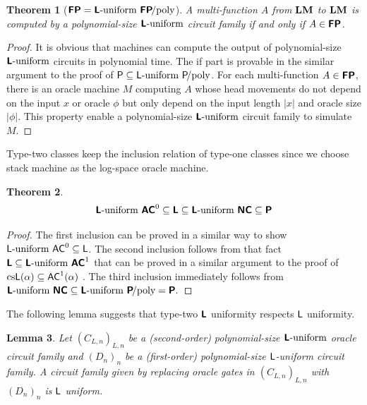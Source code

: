 \documentclass{article}
\newtheorem{theorem}{Theorem}[section]
\newtheorem{lemma}[theorem]{Lemma}
\theoremstyle{definition}
\theoremstyle{remark}
\begin{document}
\begin{theorem}
[$\text{\bfseries \sffamily \upshape FP} = \text{\bfseries \sffamily \upshape L}\text{-uniform}\ \text{\bfseries \sffamily \upshape FP}\!\text{/poly}$]
\label{theorem:P-equals-L-uniform-P-poly}
A multi-function $A$ from $\mathbf{LM}$ to $\mathbf{LM}$ is computed by a polynomial-size
$\text{\bfseries \sffamily \upshape L}\text{-uniform}$ circuit family if and only if $A \in \text{\bfseries \sffamily \upshape FP}$.
\end{theorem}

\begin{proof}
 It is obvious that machines can compute the output of
 polynomial-size $\text{\bfseries \sffamily \upshape L}\text{-uniform}$ circuits in polynomial time.
 The if part is provable in the similar argument to the proof of
 $\classP \subseteq \classL\uniform\ \classP\!\text{/poly}$.
 For each multi-function $A \in \text{\bfseries \sffamily \upshape FP}$, there is an oracle machine $M$
 computing $A$ whose head movements do not depend on the input $x$ or oracle
 $\phi$ but only depend on the input length $|x|$ and oracle size $|\phi|$.
 This property enable a polynomial-size $\text{\bfseries \sffamily \upshape L}\text{-uniform}$ circuit family to simulate $M$.
\end{proof}

Type-two classes keep the inclusion relation of type-one classes
since we choose stack machine as the log-space oracle machine.

\begin{theorem}
\label{theorem:inclusion}
\begin{equation}
 \text{\bfseries \sffamily \upshape L}\text{-uniform}\ \text{\bfseries \sffamily \upshape AC}^0
 \subseteq \text{\bfseries \sffamily \upshape L} 
 \subseteq \text{\bfseries \sffamily \upshape L}\text{-uniform}\ \text{\bfseries \sffamily \upshape NC}
 \subseteq \text{\bfseries \sffamily \upshape P}
\end{equation}
\end{theorem}

\begin{proof}
 The first inclusion can be proved in a similar way
 to show $\mathsf{L}\text{-uniform}\ \mathsf{AC}^0 \subseteq \mathsf{L}$.
 The second inclusion follows from that fact 
 $\classLtwo \subseteq \Luniform\ \classACtwo^1$ 
 that can be proved in a similar argument to 
 the proof of $\text{cs}\mathsf{L}(\alpha) \subseteq \mathsf{AC}^1(\alpha)$
 \cite{aehlig2007relativizing}.
 The third inclusion immediately follows from
$
 \Luniform\ \classNCtwo \subseteq \Luniform\ \classPtwo\text{\!/poly} = \classPtwo.
$
\end{proof}


The following lemma suggests that type-two $\text{\bfseries \sffamily \upshape L}$ uniformity respects
$\mathsf{L}$ uniformity.
\begin{lemma}
 Let $(C_{L,n})_{L,n}$ be a (second-order) polynomial-size $\text{\bfseries \sffamily \upshape L}\text{-uniform}$ oracle circuit family
 and $(D_n)_n$ be a (first-order) polynomial-size $\mathsf{L}$-uniform circuit family.
 A circuit family given by replacing oracle gates in $(C_{L,n})_{L,n}$ with
 $(D_n)_n$ is $\mathsf{L}$ uniform.
\end{lemma}
\end{document}
